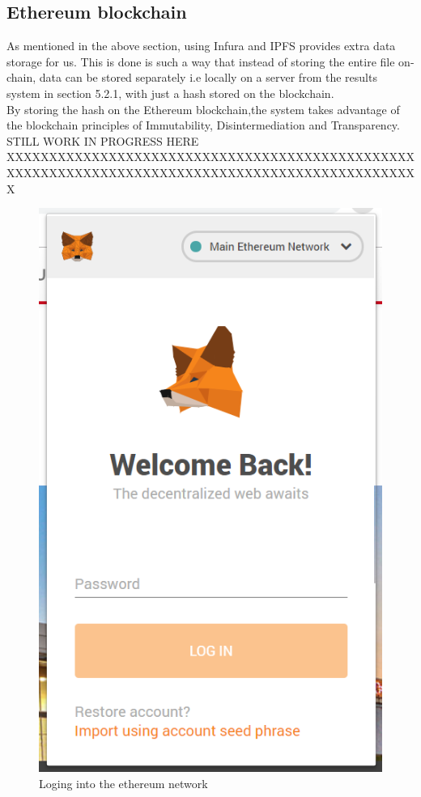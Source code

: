 \subsection{Ethereum blockchain}
As mentioned in the above section, using Infura and IPFS provides extra data storage for us. This is done is such a way that instead of storing the entire file on-chain, data can be stored separately i.e locally on a server from the results system in section 5.2.1, with just a hash stored on the blockchain.\\By storing the hash on the Ethereum blockchain,the system takes advantage of the blockchain principles of Immutability, Disintermediation and Transparency.
STILL WORK IN PROGRESS HERE
XXXXXXXXXXXXXXXXXXXXXXXXXXXXXXXXXXXXXXXXXXXXXXXXXXXXXXXXXXXXXXXXXXXXXXXXXXXXXXXXXXXXXXXXXXXXXXXXX
\begin{figure}[!h]
\center
\includegraphics[scale=0.6]{images/metamasklogin.png}
\caption{Loging into the ethereum network}
\end{figure}

